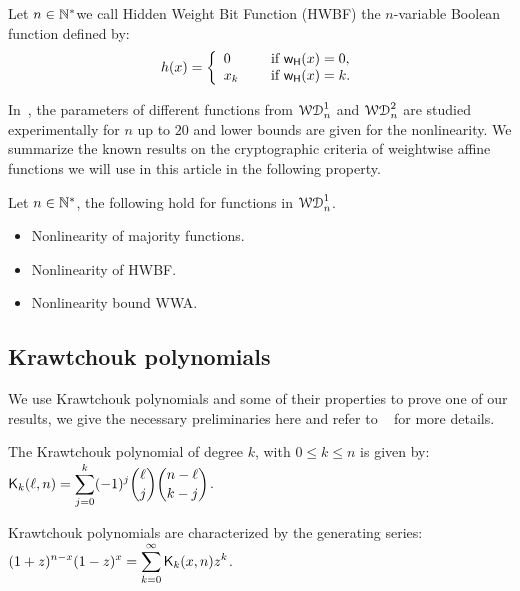 \documentclass[11pt]{llncs}
\begin{document}
\begin{definition}\label{def:hwbf}
	Let $n\in \mathbb{N}^*$we call Hidden Weight Bit Function (HWBF) the $n$-variable Boolean function defined by:
	\[h(x)= \left\{ 
	\begin{array}{l l}
	0 & \quad \text{ if } \mathsf{w_H}(x) =0, \\
	x_k & \quad \text{ if } \mathsf{w_H}(x)=k.
	\end{array} \right. \] 

\end{definition}

In~\cite{DAM:MeaOza24}, the parameters of different functions from $\mathcal{WD}^{1}_{n}$ and $\mathcal{WD}^{2}_{n}$ are studied experimentally for $n$ up to $20$ and lower bounds are given for the nonlinearity. 
We summarize the known results on the cryptographic criteria of weightwise affine functions we will use in this article in the following property.



\begin{property}
Let $n\in \mathbb{N}^*$, the following hold for functions in $\mathcal{WD}^{1}_{n}$.
\begin{itemize}
	\item Nonlinearity of majority functions.
	\item Nonlinearity of HWBF.
	\item Nonlinearity bound WWA.
\end{itemize}
	

	
	
	
	
\end{property}






\subsection{Krawtchouk polynomials}
We use Krawtchouk polynomials and some of their properties to prove one of our results, we give the necessary preliminaries here and refer to \eg ~\cite{book:MacSlo78} for more details.

\begin{definition}\label{def:Kraw}
	The Krawtchouk polynomial of degree $k$, with $0\leq k\leq n$ is given by: $ \displaystyle \mathsf{K}_{k}(\ell,n)=\sum_{j=0}^{k} (-1)^j \binom{\ell}{j} \binom{n-\ell}{k-j}$. 
	
	Krawtchouk polynomials are characterized by the generating series: $ \displaystyle (1+z)^{n-x} (1-z)^x=\sum_{k=0}^\infty \mathsf{K}_{k}(x,n) z^k$.
\end{definition}
\end{document}
